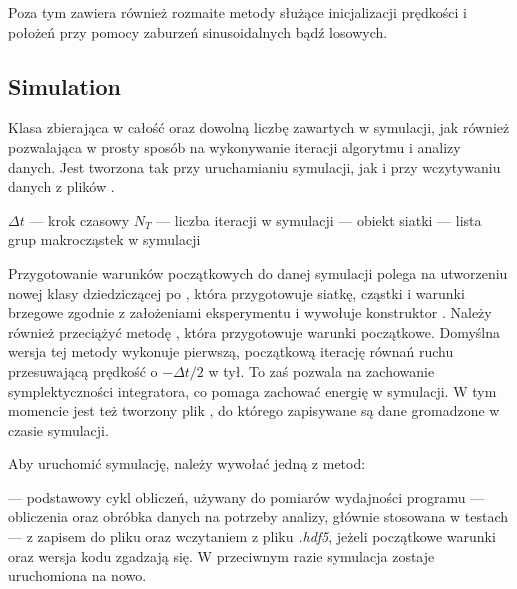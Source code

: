 Poza tym  zawiera również rozmaite metody służące inicjalizacji
prędkości i położeń przy pomocy zaburzeń sinusoidalnych bądź losowych.

\subsection{Simulation}
Klasa zbierająca w całość  oraz dowolną liczbę  zawartych w
symulacji, jak również pozwalająca w prosty sposób na wykonywanie iteracji
algorytmu i analizy danych. Jest tworzona tak przy uruchamianiu symulacji,
jak i przy wczytywaniu danych z plików .

\begin{itemize}
    \itemi{} $\Delta t$ --- krok czasowy
    \itemi{} $N_T$ --- liczba iteracji w symulacji
    \itemi{}  --- obiekt siatki
    \itemi{}  --- lista grup makrocząstek w symulacji
\end{itemize}

Przygotowanie warunków początkowych do danej symulacji polega na utworzeniu
nowej klasy dziedziczącej po , która przygotowuje siatkę,
cząstki i warunki brzegowe zgodnie z założeniami eksperymentu i wywołuje
konstruktor .  Należy również przeciążyć metodę
, która przygotowuje warunki początkowe.
Domyślna wersja tej metody wykonuje pierwszą, początkową iterację równań ruchu
przesuwającą prędkość o $-\Delta t / 2$ w tył. To zaś pozwala na zachowanie
symplektyczności integratora, co pomaga zachować energię w symulacji.  W tym
momencie jest też tworzony plik , do którego zapisywane są dane
gromadzone w czasie symulacji.

Aby uruchomić symulację, należy wywołać jedną z metod:
\begin{itemize}
     \itemi{}  --- podstawowy cykl obliczeń, używany do pomiarów
         wydajności programu
     \itemi{}  --- obliczenia oraz obróbka danych na potrzeby
         analizy, głównie stosowana w testach
     \itemi{}  ---  z zapisem do pliku oraz
         wczytaniem z pliku \emph{.hdf5}, jeżeli początkowe warunki oraz
         wersja kodu zgadzają się. W przeciwnym razie symulacja zostaje
         uruchomiona na nowo.
\end{itemize}


